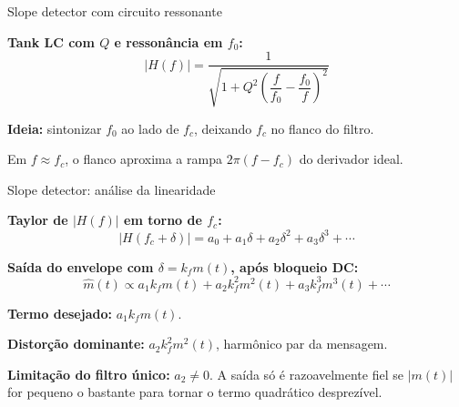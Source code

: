 
\begin{frame}{Slope detector com circuito ressonante}

\small
\textbf{Tank LC com $Q$ e ressonância em $f_0$:}
\[
|H(f)| = \dfrac{1}{\sqrt{1 + Q^2\!\left(\dfrac{f}{f_0} - \dfrac{f_0}{f}\right)^{\!2}}}
\]

\pause
\textbf{Ideia:} sintonizar $f_0$ ao lado de $f_c$, deixando $f_c$ no flanco do filtro.

\begin{center}
\end{center}

Em $f \approx f_c$, o flanco aproxima a rampa $2\pi(f-f_c)$ do derivador ideal.

\end{frame}


\begin{frame}{Slope detector: análise da linearidade}

\textbf{Taylor de $|H(f)|$ em torno de $f_c$:}
\[
|H(f_c + \delta)| = a_0 + a_1 \delta + a_2 \delta^2 + a_3 \delta^3 + \cdots
\]

\pause
\vspace{0.1cm}
\textbf{Saída do envelope com $\delta = k_f m(t)$, após bloqueio DC:}
\[
\hat m(t) \propto a_1 k_f m(t) + a_2 k_f^2 m^2(t) + a_3 k_f^3 m^3(t) + \cdots
\]

\pause
\vspace{0.1cm}
\textbf{Termo desejado:} $a_1 k_f m(t)$.

\textbf{Distorção dominante:} $a_2 k_f^2 m^2(t)$, harmônico par da mensagem.

\pause
\vspace{0.1cm}
\textbf{Limitação do filtro único:} $a_2 \neq 0$. A saída só é razoavelmente fiel se $|m(t)|$ for pequeno o bastante para tornar o termo quadrático desprezível.

\end{frame}

